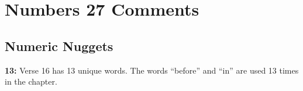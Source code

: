 \section{Numbers 27 Comments}

\subsection{Numeric Nuggets}
\textbf{13: } Verse 16 has 13 unique words. The words ``before'' and ``in'' are used 13 times in the chapter.

